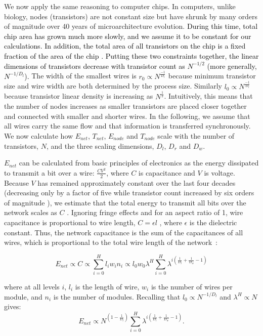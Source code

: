 \documentclass[12pt]{article}
\newcommand{\red}[1]{\textcolor{black}{#1}}
\begin{document}
We now apply the same reasoning to computer chips. 
In computers, unlike biology,  nodes (transistors) 
are not constant size but have shrunk by many orders of magnitude over 40
years of microarchitecture evolution.  \red{During this time, total chip area has grown
much more slowly, and we assume it to be constant for our
calculations.   In addition, the total area of all transistors on the
chip is a fixed fraction of the area of the chip \cite{moses08}. 
Putting these two constraints together, the linear dimensions of transistors
decrease with transistor count as $N^{-1/2}$ (more generally,
$N^{-1/D_l}$). } The width of the smallest wires is 
$r_0 \propto N^{\frac{-1}{D_l}}$ because minimum
transistor size and wire width are both determined by the process size.
Similarly $l_0 \propto  N^{\frac{-1}{D_l}}$ because transistor linear density
is increasing as $N^{\frac{1}{2}}$.
Intuitively, this means
that the number of nodes increases as smaller transistors are placed closer
together and connected with smaller and shorter wires. In the following,
we assume that all wires carry the same flow and that information is
transferred synchronously. We now calculate how $E_{net}$, $T_{net}$,
$E_{node}$ and $T_{node}$ scale with the number of transistors, $N$, and the three
scaling dimensions, $D_l$, $D_r$ and $D_w$.

$E_{net}$ can be calculated from basic principles of electronics as the energy
dissipated to transmit a bit over a wire: $\frac{CV^2}{2}$, where $C$ is
capacitance and $V$ is voltage.  Because $V$ has remained approximately
constant over the last four decades (decreasing only by a factor of five while
transistor count increased by six orders of magnitude \cite{ning07}), we
estimate that the total energy to transmit all bits over the network scales as
$C$ \cite{bingham08}.  Ignoring fringe effects and for an aspect ratio of 1,
wire capacitance is proportional to wire length, $C = \epsilon l$
\cite{wilhelm95}, where $\epsilon$ is the dielectric constant. Thus, the
network capacitance is the sum of the capacitances of all wires, which is
proportional to the total wire length of the network~\cite{donath79}:

\begin{equation}
  \label{eq:ChipsEnet}
  E_{net} \propto C \propto  \sum_{i=0}^H l_i w_i n_i \propto l_0 w_0 \lambda^H
\sum_{i=0}^H \lambda^{i \left( \frac{1}{D_l} + \frac{1}{D_w} -1  \right)} 
\end{equation}

\noindent where at all levels $i$, $l_i$ is the length of wire, $w_i$ is the number of wires per
module, and $n_i$ is the number of modules. Recalling that
$l_0 \propto N^{-1/D_l}$ and $\lambda^H \propto N$ gives: 
\begin{equation}
\label{eq:comp-Enet}
  E_{net}  \propto  N^{(1- \frac{1}{D_l})} \sum_{i=0}^H \lambda^{i \left( 
\frac{1}{D_l} + \frac{1}{D_w} -1 \right)} .
\end{equation}
\end{document}
